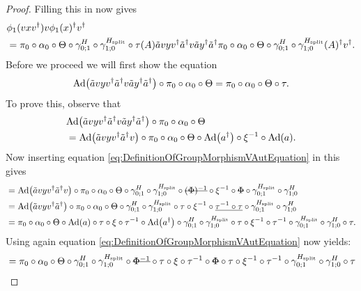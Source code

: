 \documentclass[11pt,a4paper,twoside]{article}
\numberwithin{equation}{section}
\begin{document}
\begin{proof}
		Filling this in now gives
		\begin{align}
			&\phi_1(vxv^\dagger)v\phi_1(x)^\dagger v^\dagger\\
			\label{eq:lem:phi1phi2matchingCondition:Proof_v_Part1Appendix}
			&=\pi_0\circ\alpha_0\circ\Theta\circ\gamma^{H}_{0;1}\circ\gamma^{{H_{\text{split}}}}_{1;0}\circ\tau(A)\tilde{a}vyv^\dagger\tilde{a}^\dagger v \tilde{a}y^\dagger\tilde{a}^\dagger \pi_0\circ\alpha_0\circ\Theta\circ\gamma^{H}_{0;1}\circ\gamma^{{H_{\text{split}}}}_{1;0}(A)^\dagger v^\dagger.
		\end{align}
		Before we proceed we will first show the equation
		\begin{equation}\label{eq:lem:phi1phi2matchingCondition:Proof_v_Part2Appendix}
			\Ad{\tilde{a}vyv^\dagger\tilde{a}^\dagger v\tilde{a}y^\dagger\tilde{a}^\dagger}\circ\pi_0\circ\alpha_0\circ\Theta=\pi_0\circ\alpha_0\circ\Theta\circ\tau.
		\end{equation}
		To prove this, observe that
		\begin{align}
			&\Ad{\tilde{a}vyv^\dagger\tilde{a}^\dagger v\tilde{a}y^\dagger\tilde{a}^\dagger}\circ\pi_0\circ\alpha_0\circ\Theta\\
			&=\Ad{\tilde{a}vyv^\dagger\tilde{a}^\dagger v}\circ\pi_0\circ\alpha_0\circ\Theta\circ\Ad{a^\dagger}\circ\xi^{-1}\circ\Ad{a}.
		\end{align}
		Now inserting equation \eqref{eq:DefinitionOfGroupMorphismVAutEquation} in this gives
		\begin{align}
			&=\Ad{\tilde{a}vyv^\dagger\tilde{a}^\dagger v}\circ\pi_0\circ\alpha_0\circ\Theta\circ\gamma^{H}_{0;1}\circ\gamma^{\Hsplit}_{1;0}\circ\stkout{(\Phi)^{-1}}\circ\xi^{-1}\circ\stkout{\Phi}\circ\gamma^{\Hsplit}_{0;1}\circ\gamma^H_{1;0}\\
			&=\Ad{\tilde{a}vyv^\dagger\tilde{a}^\dagger }\circ\pi_0\circ\alpha_0\circ\Theta\circ\gamma^{H}_{0;1}\circ\gamma^{\Hsplit}_{1;0}\circ\tau\circ\xi^{-1}\circ\underline{\tau^{-1}\circ\tau}\circ\gamma^{\Hsplit}_{0;1}\circ\gamma^H_{1;0}\\
			&=\pi_0\circ\alpha_0\circ\Theta\circ\Ad{a}\circ\tau\circ\xi\circ\tau^{-1}\circ\Ad{a^\dagger}\circ\gamma^{H}_{0;1}\circ\gamma^{\Hsplit}_{1;0}\circ\tau\circ\xi^{-1}\circ\tau^{-1}\circ\gamma^{\Hsplit}_{0;1}\circ\gamma^H_{1;0}\circ\tau.
		\end{align}
		Using again equation \eqref{eq:DefinitionOfGroupMorphismVAutEquation} now yields:
		\begin{align}
			&=\pi_0\circ\alpha_0\circ\Theta\circ\gamma^{H}_{0;1}\circ\gamma^{\Hsplit}_{1;0}\circ\stkout{\Phi^{-1}}\circ\tau\circ\xi\circ\tau^{-1}\circ\stkout{\Phi}\circ\tau\circ\xi^{-1}\circ\tau^{-1}\circ\gamma^{\Hsplit}_{0;1}\circ\gamma^H_{1;0}\circ\tau\\

\end{align}
\end{proof}
\end{document}
